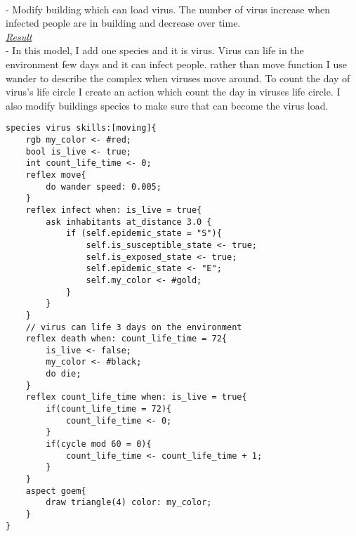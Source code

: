 \documentclass{article}
\begin{document}
\\- Modify building which can load virus. The number of virus increase when infected people are in building and decrease over time.
\\
\underline{\emph{Result}}\\
- In this model, I add one species and it is virus. Virus can life in the environment few days and it can infect people. rather than move function I use wander to describe the complex when viruses move around. To count the day of virus's life circle I create an action which count the day in viruses life circle. I also modify buildings species to make sure that can become the virus load.
\begin{lstlisting}
species virus skills:[moving]{
	rgb my_color <- #red;
	bool is_live <- true;
	int count_life_time <- 0;
	reflex move{
		do wander speed: 0.005;
	}
	reflex infect when: is_live = true{
		ask inhabitants at_distance 3.0 {
			if (self.epidemic_state = "S"){
				self.is_susceptible_state <- true;
				self.is_exposed_state <- true;
				self.epidemic_state <- "E";
				self.my_color <- #gold;
			}
		}
	}
	// virus can life 3 days on the environment
	reflex death when: count_life_time = 72{
		is_live <- false;
		my_color <- #black;
		do die;
	}
	reflex count_life_time when: is_live = true{
		if(count_life_time = 72){
			count_life_time <- 0;
		}
		if(cycle mod 60 = 0){
			count_life_time <- count_life_time + 1;
		}
	}
	aspect goem{
		draw triangle(4) color: my_color;
	}
}
\end{lstlisting}
\\
\end{document}
